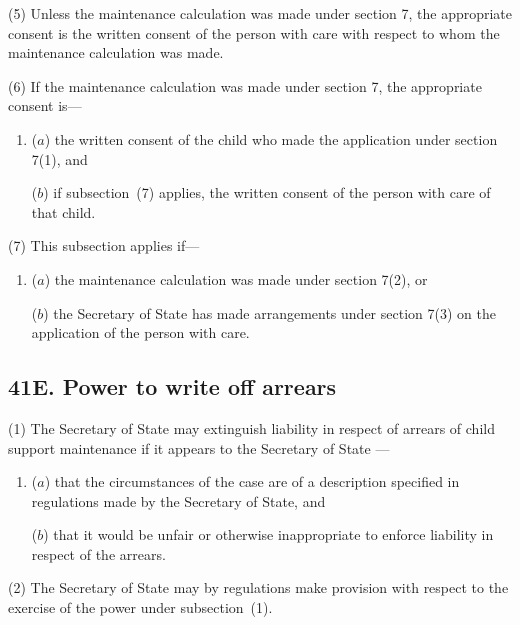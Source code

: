 \documentclass[12pt,a4paper]{article}
\begin{document}
(5)
Unless the maintenance calculation was made under section 7, the appropriate consent is the written consent of the person with care with respect to whom the maintenance calculation was made.

(6)
If the maintenance calculation was made under section 7, the appropriate consent is---
\begin{enumerate}\item[]
($a$) the written consent of the child who made the application under section 7(1), and

($b$) if subsection~(7) applies, the written consent of the person with care of that child.
\end{enumerate}

(7) This subsection applies if---
\begin{enumerate}\item[]
($a$) the maintenance calculation was made under section 7(2), or

($b$) the Secretary of State has made arrangements under section 7(3) on the application of the person with care.
\end{enumerate}


\subsection{41E. Power to write off arrears}

(1) The 
Secretary of State %
may extinguish liability in respect of arrears of child support maintenance if it appears to 
the Secretary of State%
---
\begin{enumerate}\item[]
($a$) that the circumstances of the case are of a description specified in regulations made by the Secretary of State, and

($b$) that it would be unfair or otherwise inappropriate to enforce liability in
respect of the arrears.
\end{enumerate}

(2)
The Secretary of State may by regulations make provision with respect to the exercise of the power under subsection~(1).
\end{document}
